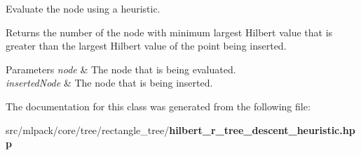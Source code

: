 Evaluate the node using a heuristic. 

Returns the number of the node with minimum largest Hilbert value that is greater than the largest Hilbert value of the point being inserted.


\begin{DoxyParams}{Parameters}
{\em node} & The node that is being evaluated. \\
\hline
{\em inserted\+Node} & The node that is being inserted. \\
\hline
\end{DoxyParams}


The documentation for this class was generated from the following file\+:\begin{DoxyCompactItemize}
\item 
src/mlpack/core/tree/rectangle\+\_\+tree/{\bf hilbert\+\_\+r\+\_\+tree\+\_\+descent\+\_\+heuristic.\+hpp}\end{DoxyCompactItemize}
